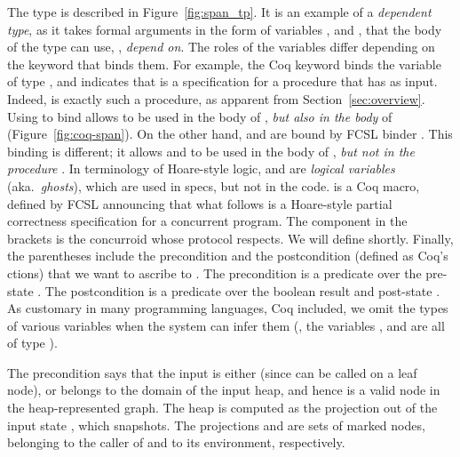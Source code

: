The type  is described in Figure~\ref{fig:span_tp}.
%
It is an example of a \emph{dependent type}, as it takes formal
arguments in the form of variables ,  and ,
that the body of the type can use, \ie, \emph{depend on}.  The roles of
the variables differ depending on the keyword that binds them.
%
For example, the Coq keyword  binds the variable 
of type , and indicates that  is a
specification for a procedure that has  as input. Indeed,
 is exactly such a procedure, as apparent from
Section~\ref{sec:overview}. Using  to bind 
allows  to be used in the body of , \emph{but
  also in the body} of  (Figure~\ref{fig:coq-span}).
%
On the other hand,  and  are bound by FCSL binder
. This binding is different; it allows  and
 to be used in the body of , \emph{but not in
  the procedure} . In terminology of Hoare-style logic,
 and  are \emph{logical variables}
(aka.~\emph{ghosts}), which are used in specs, but not in the code.
%
 is a Coq macro, defined by FCSL announcing that what
follows is a Hoare-style partial correctness specification for a
concurrent program. The component  in the brackets
is the concurroid whose protocol  respects. We will
define  shortly. Finally, the parentheses
include the precondition and the postcondition (defined as Coq's
ctions) that we want to ascribe to . The
precondition is a predicate over the pre-state . The
postcondition is a predicate over the boolean result  and
post-state . As customary in many programming languages, Coq
included, we omit the types of various variables when the system can
infer them (\eg, the variables ,  and  are
all of type ).

The precondition says that the input  is either 
(since  can be called on a leaf node), or belongs to the
domain of the input heap, and hence is a valid node in the
heap-represented graph. The heap is computed as the projection
 out of the input state , which 
snapshots.  The projections  and  are sets of
marked nodes, belonging to the caller of  and to its
environment, respectively.

